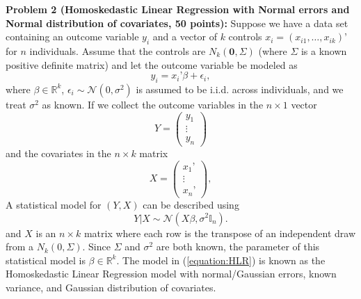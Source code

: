 \documentclass[11pt]{article} %
\begin{document}
\noindent \textbf{Problem 2 (Homoskedastic Linear Regression with Normal errors and Normal distribution of covariates, 50 points):} Suppose we have a data set containing an outcome variable $y_i$ and a vector of $k$ controls $x_i = (x_{i1},\ldots, x_{ik})’$ for $n$ individuals. Assume that the controls are $N_k(\mathbf{0},\Sigma)$ (where $\Sigma$ is a known positive definite matrix) and let the outcome variable be modeled as
\[ y_i = x_i’ \beta + \epsilon_{i}, \]
where $\beta \in \mathbb{R}^{k}$, $\epsilon_{i} \sim \mathcal{N}(0, \sigma^2)$ is assumed to be i.i.d. across individuals, and we treat $\sigma^2$ as known.  If we collect the outcome variables in the $n \times 1$ vector
\[ 
Y = 
\begin{pmatrix}
y_{1} \\
\vdots \\
y_{n}
\end{pmatrix} 
\]
and the covariates in the $n \times k$ matrix
\[ X =
\begin{pmatrix}
x_1’ \\
\vdots\\
x_n’
\end{pmatrix},
\]
A statistical model for $(Y,X)$ can be described using  
\begin{equation} \label{equation:HLR}
Y | X \sim \mathcal{N}(X \beta, \sigma^2 \mathbb{I}_n ). 
\end{equation}
and $X$ is an $n \times k$ matrix where each row is the transpose of an independent draw from a $N_k(0, \Sigma)$. Since $\Sigma$ and $\sigma^2$ are both known, the parameter of this statistical model is $\beta \in \mathbb{R}^{k}$. The model in (\ref{equation:HLR}) is known as the Homoskedastic Linear Regression model with normal/Gaussian errors, known variance, and Gaussian distribution of covariates. 
\end{document}
